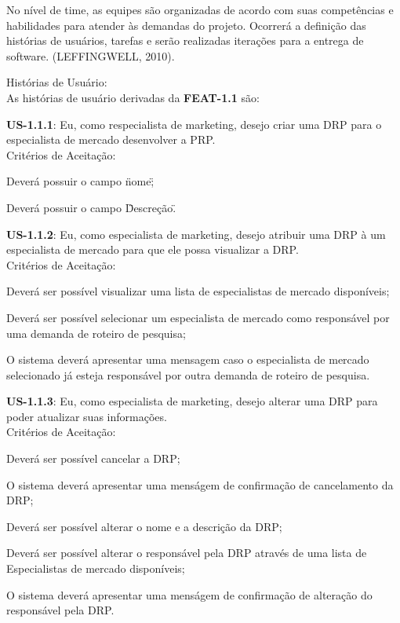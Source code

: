 			No nível de time, as equipes são organizadas de acordo com suas competências e habilidades para atender às demandas do projeto. Ocorrerá a definição das histórias de usuários, tarefas e serão realizadas iterações para a entrega de software. (LEFFINGWELL, 2010).

			\begin{itemize}
			{
				\item Histórias de Usuário:\\
				As histórias de usuário derivadas da \textbf{FEAT-1.1} são:
				\begin{itemize}
				{
					\item \textbf{US-1.1.1}: Eu, como respecialista de marketing, desejo criar uma DRP para o especialista de mercado desenvolver a PRP.\\
					Critérios de Aceitação:
						\begin{enumerate}
						{
							\item Deverá possuir o campo \"nome\";
							\item Deverá possuir o campo \"Descreção\".
						}
						\end{enumerate}

					\item \textbf{US-1.1.2}: Eu, como especialista de marketing, desejo atribuir uma DRP à um especialista de mercado para que ele possa visualizar a DRP.\\
					Critérios de Aceitação:
						\begin{enumerate}
						{
							\item Deverá ser possível visualizar uma lista de especialistas de mercado disponíveis;
							\item Deverá ser possível selecionar um especialista de mercado como responsável por uma demanda de roteiro de pesquisa;
							\item O sistema deverá apresentar uma mensagem caso o especialista de mercado selecionado já esteja responsável por outra demanda de roteiro de pesquisa.
						}
						\end{enumerate}

					\item \textbf{US-1.1.3}: Eu, como especialista de marketing, desejo alterar uma DRP para poder atualizar suas informações.\\
					Critérios de Aceitação:
						\begin{enumerate}
						{
							\item Deverá ser possível cancelar a DRP;
							\item O sistema deverá apresentar uma menságem de confirmação de cancelamento da DRP;
							\item Deverá ser possível alterar o nome e a descrição da DRP;
							\item Deverá ser possível alterar o responsável pela DRP através de uma lista de Especialistas de mercado disponíveis;
							\item O sistema deverá apresentar uma menságem de confirmação de alteração do responsável pela DRP.\\
						}
						\end{enumerate}

}
\end{itemize}}
\end{itemize}

